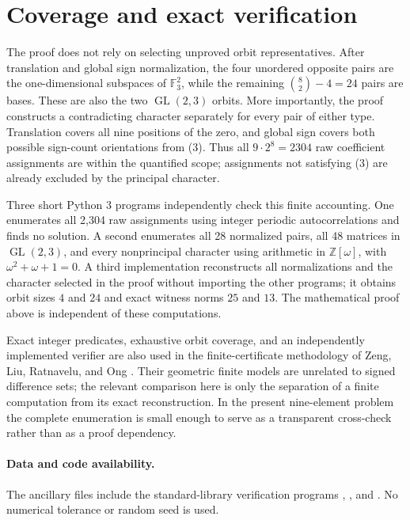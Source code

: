 \documentclass[11pt]{article}
\newcommand{\F}{\mathbb F}
\newcommand{\Z}{\mathbb Z}
\begin{document}
\section{Coverage and exact verification}

The proof does not rely on selecting unproved orbit representatives.  After
translation and global sign normalization, the four unordered opposite
pairs are the one-dimensional subspaces of $\F_3^2$, while the remaining
$\binom{8}{2}-4=24$ pairs are bases.  These are also the two
$\operatorname{GL}(2,3)$ orbits.  More importantly, the proof constructs a
contradicting character separately for every pair of either type.
Translation covers all nine positions of the zero, and global sign covers
both possible sign-count orientations from (3).  Thus all
$9\cdot2^8=2304$ raw coefficient assignments are within the quantified
scope; assignments not satisfying (3) are already excluded by the principal
character.

Three short Python 3 programs independently check this finite accounting.
One enumerates all 2,304 raw assignments using integer periodic
autocorrelations and finds no solution.  A second enumerates all 28 normalized
pairs, all 48 matrices in $\operatorname{GL}(2,3)$, and every nonprincipal
character using arithmetic in $\Z[\omega]$, with
$\omega^2+\omega+1=0$.  A third implementation reconstructs all
normalizations and the character selected in the proof without importing the
other programs; it obtains orbit sizes $4$ and $24$ and exact witness norms
$25$ and $13$.  The mathematical proof above is independent of these
computations.

Exact integer predicates, exhaustive orbit coverage, and an independently
implemented verifier are also used in the finite-certificate methodology of
Zeng, Liu, Ratnavelu, and Ong \cite{ZengEtAl2026Certificates}.  Their
geometric finite models are unrelated to signed difference sets; the relevant
comparison here is only the separation of a finite computation from its
exact reconstruction.  In the present nine-element problem the complete
enumeration is small enough to serve as a transparent cross-check rather than
as a proof dependency.

\paragraph{Data and code availability.}
{\raggedright
The ancillary files include the standard-library verification programs
, , and
\linebreak{}.  No numerical tolerance or
random seed is used.\par
}
\end{document}
